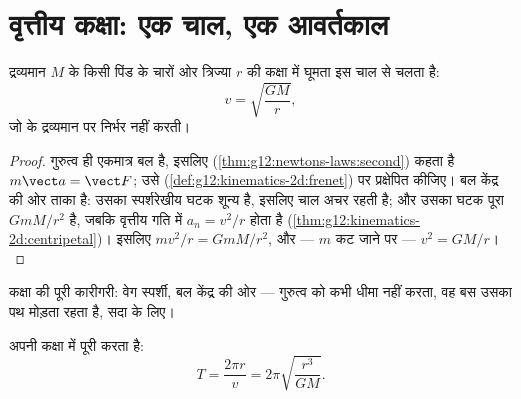\section{वृत्तीय कक्षा: एक चाल, एक आवर्तकाल}

\begin{theorem}[कक्षीय चाल]\label{thm:g12:satellites-kepler:speed}
द्रव्यमान $M$ के किसी पिंड के चारों ओर त्रिज्या $r$ की  कक्षा में घूमता  इस चाल से चलता है:
\[ v = \sqrt{\frac{G M}{r}}, \]
जो  के द्रव्यमान पर निर्भर नहीं करती।
\end{theorem}

\begin{proof}
गुरुत्व ही एकमात्र बल है, इसलिए  (\cref{thm:g12:newtons-laws:second})
कहता है $m\vect a = \vect F$; उसे  (\cref{def:g12:kinematics-2d:frenet}) पर प्रक्षेपित कीजिए।
बल केंद्र की ओर ताका है: उसका स्पर्शरेखीय घटक शून्य है, इसलिए चाल अचर
रहती है; और उसका  घटक पूरा $GmM/r^2$ है, जबकि वृत्तीय गति में $a_n = v^2/r$ होता
है (\cref{thm:g12:kinematics-2d:centripetal})। इसलिए $m v^2/r =
GmM/r^2$, और --- $m$ कट जाने पर --- $v^2 = GM/r$।
\end{proof}

\begin{omfigure}

{\small कक्षा की पूरी कारीगरी: वेग स्पर्शी, बल केंद्र की ओर
--- गुरुत्व  को कभी धीमा नहीं करता, वह बस उसका पथ मोड़ता रहता
है, सदा के लिए।}
\end{omfigure}

\begin{proposition}[कक्षीय आवर्तकाल]\label{prop:g12:satellites-kepler:period}
 अपनी कक्षा  में पूरी करता है:
\[ T = \frac{2\pi r}{v} = 2\pi \sqrt{\frac{r^3}{G M}}. \]
\end{proposition}

